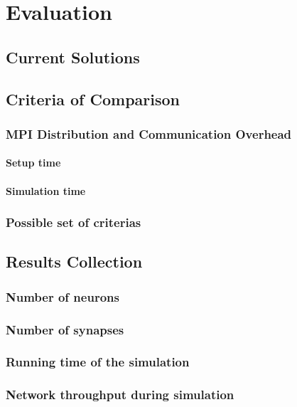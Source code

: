 \chapter{Evaluation}

\section{Current Solutions}

\section{Criteria of Comparison}

\subsection{MPI Distribution and Communication Overhead}

\subsubsection{Setup time}

\subsubsection{Simulation time}

\subsection{Possible set of criterias}

\section{Results Collection}

\subsection{Number of neurons}

\subsection{Number of synapses}

\subsection{Running time of the simulation}

\subsection{Network throughput during simulation}
